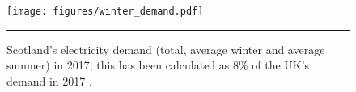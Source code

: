 \begin{figure}[htbp]
	\centering
	\texttt{[image: figures/winter\_demand.pdf]}
	\rule{\textwidth}{0.5pt} %
	\caption{Scotland's electricity demand (total, average winter and average summer) in 2017; this has been calculated as 8\% of the UK's demand in 2017 \citep{GridWatchnd}.}
	\label{fig:winter_demand}
\end{figure}
